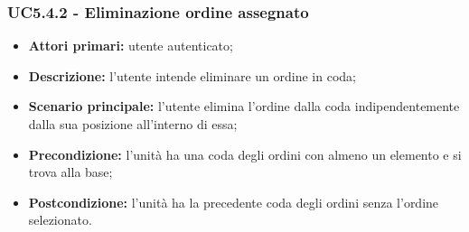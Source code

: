 \subsubsection{UC5.4.2 - Eliminazione ordine assegnato}
\begin{itemize}
    \item \textbf{Attori primari:} utente autenticato;
    \item \textbf{Descrizione:} l'utente intende eliminare un ordine in coda;
    \item \textbf{Scenario principale:} l'utente elimina l'ordine dalla coda indipendentemente dalla sua posizione all'interno di essa;
    \item \textbf{Precondizione:} l'unità ha una coda degli ordini con almeno un elemento e si trova alla base;
    \item \textbf{Postcondizione:} l'unità ha la precedente coda degli ordini senza l'ordine selezionato.
\end{itemize}

